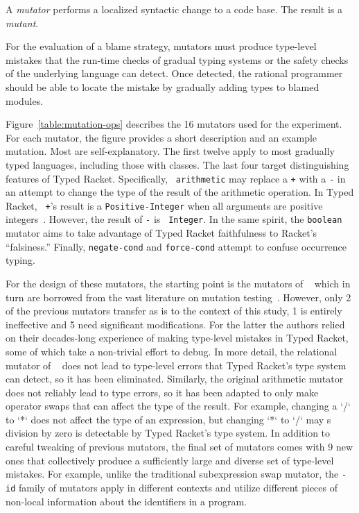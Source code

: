 
A {\it mutator\/} performs a localized syntactic change to a code base. The
result is a {\em mutant\/}.

For the evaluation of a blame strategy, mutators must produce type-level
mistakes that the run-time checks of gradual typing systems or the safety
checks of the underlying language can detect. Once detected, the rational
programmer should be able to locate the mistake by gradually adding types to
blamed modules.

Figure~\ref{table:mutation-ops} describes the 16 mutators used for the
experiment.  For each mutator, the figure provides a short description and
an example mutation.  Most are self-explanatory.  The first twelve apply
to most gradually typed languages, including those with classes.  The last
four target distinguishing features of Typed Racket.  Specifically, {\tt
arithmetic} may replace a {\tt +} with a {\tt -} in an attempt to change
the type of the result of the arithmetic operation. In Typed Racket, {\tt
+}'s result is a {\tt Positive-Integer} when all arguments are positive
integers~\cite{stathff-padl-12}. However, the result of {\tt -} is {\tt
Integer}. In the same spirit, the {\tt boolean} mutator aims to take
advantage of Typed Racket faithfulness to Racket's ``falsiness.'' Finally,
{\tt negate-cond} and {\tt force-cond} attempt to confuse occurrence
typing.

For the design of these mutators, the starting point is the mutators of
~\citet{lksfd-popl-2020} which in turn are borrowed from   the vast
literature on mutation testing~\cite{jia2011analysis}. However, only 2
of the previous mutators transfer as is to the context of this study, 1 is
entirely ineffective and 5 need significant modifications. For the
latter  the authors relied on their decades-long experience of making type-level mistakes in Typed
Racket, some of which take a non-trivial effort to debug.  In more detail,
the relational mutator of ~\citet{lksfd-popl-2020} does not lead to
type-level errors that Typed Racket's type system can detect, so it has
been eliminated. Similarly, the original arithmetic mutator does not
reliably lead to type errors, so it has been adapted to only make operator
swaps that can affect the type of the result. For example, changing a `/`
to `*` does not affect the type of an expression, but changing `*` to `/`
may s division by zero is detectable by Typed Racket's type system. 
In addition to careful tweaking of previous mutators, the final
set of mutators comes with 9 new ones that collectively
produce a sufficiently large and diverse set of type-level mistakes. 
For example, unlike the traditional subexpression swap mutator, 
the {\tt -id} family of mutators apply in different
contexts and utilize different pieces of non-local information about the
identifiers in a program. 


